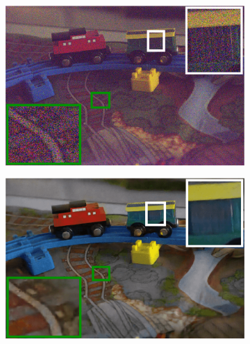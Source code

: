 \documentclass[letterpaper,12pt]{article}
\begin{document}
\begin{figure}[htbp]
\begin{subfigure}{0.3\textwidth}
				\captionsetup{font=scriptsize}
				\label{fig: qualitative_comparison_c}  
			\end{subfigure}\\
			\begin{subfigure}{0.3\textwidth}
				\includegraphics[width=\linewidth]{qualitative_comparison/d}
				\captionsetup{font=scriptsize}
				\label{fig: qualitative_comparison_d}
			\end{subfigure}
			\begin{subfigure}{0.3\textwidth}
				\includegraphics[width=\linewidth]{qualitative_comparison/e}
				\captionsetup{font=scriptsize}
				\label{fig: qualitative_comparison_e}
			\end{subfigure}
			\begin{subfigure}{0.3\textwidth}

\end{subfigure}
\end{figure}
\end{document}
